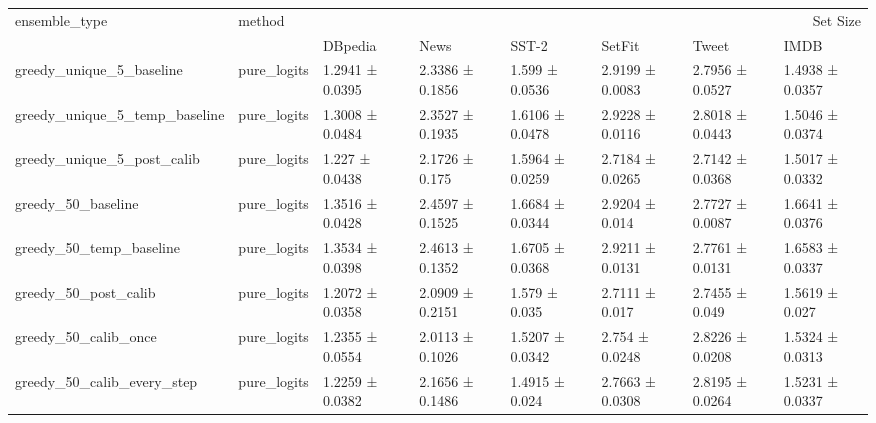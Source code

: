\begin{tabular}{llllllll}
\toprule
ensemble_type & method & \multicolumn{6}{r}{Set Size} \\
 &  & DBpedia & News & SST-2 & SetFit & Tweet & IMDB \\
\midrule
greedy_unique_5_baseline & pure_logits & 1.2941 ± 0.0395 & 2.3386 ± 0.1856 & 1.599 ± 0.0536 & 2.9199 ± 0.0083 & 2.7956 ± 0.0527 & 1.4938 ± 0.0357 \\
greedy_unique_5_temp_baseline & pure_logits & 1.3008 ± 0.0484 & 2.3527 ± 0.1935 & 1.6106 ± 0.0478 & 2.9228 ± 0.0116 & 2.8018 ± 0.0443 & 1.5046 ± 0.0374 \\
greedy_unique_5_post_calib & pure_logits & 1.227 ± 0.0438 & 2.1726 ± 0.175 & 1.5964 ± 0.0259 & 2.7184 ± 0.0265 & 2.7142 ± 0.0368 & 1.5017 ± 0.0332 \\
greedy_50_baseline & pure_logits & 1.3516 ± 0.0428 & 2.4597 ± 0.1525 & 1.6684 ± 0.0344 & 2.9204 ± 0.014 & 2.7727 ± 0.0087 & 1.6641 ± 0.0376 \\
greedy_50_temp_baseline & pure_logits & 1.3534 ± 0.0398 & 2.4613 ± 0.1352 & 1.6705 ± 0.0368 & 2.9211 ± 0.0131 & 2.7761 ± 0.0131 & 1.6583 ± 0.0337 \\
greedy_50_post_calib & pure_logits & 1.2072 ± 0.0358 & 2.0909 ± 0.2151 & 1.579 ± 0.035 & 2.7111 ± 0.017 & 2.7455 ± 0.049 & 1.5619 ± 0.027 \\
greedy_50_calib_once & pure_logits & 1.2355 ± 0.0554 & 2.0113 ± 0.1026 & 1.5207 ± 0.0342 & 2.754 ± 0.0248 & 2.8226 ± 0.0208 & 1.5324 ± 0.0313 \\
greedy_50_calib_every_step & pure_logits & 1.2259 ± 0.0382 & 2.1656 ± 0.1486 & 1.4915 ± 0.024 & 2.7663 ± 0.0308 & 2.8195 ± 0.0264 & 1.5231 ± 0.0337 \\
\bottomrule
\end{tabular}
